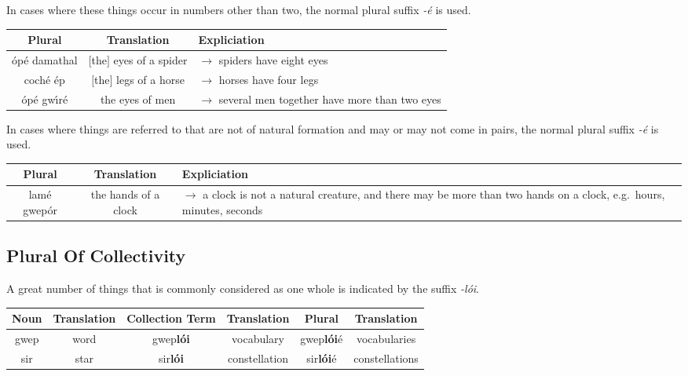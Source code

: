 In cases where these things occur in numbers other than two, the normal plural suffix \textit{-\'{e}} is used.
\begin{table}[H]
\centering
\begin{tabu}{c|c|M{10.0cm}}
  \textbf{Plural} & \textbf{Translation} & \textbf{Expliciation}\\
  \toprule
  \'{o}p\'{e} damathal & $[$the$]$ eyes of a spider & $\rightarrow$ spiders have eight eyes\\
  coch\'{e} \'{e}p & $[$the$]$ legs of a horse & $\rightarrow$ horses have four legs\\
  \'{o}p\'{e} gw\'{\i}r\'{e} & the eyes of men & $\rightarrow$ several men together have more than two eyes
\end{tabu}
\label{example_plural_more_than_two}
\end{table}

In cases where things are referred to that are not of natural formation and may or may not come in pairs, the normal plural suffix \textit{-\'{e}} is used.
\begin{table}[H]
\centering
\begin{tabu}{c|c|M{10.0cm}}
  \textbf{Plural} & \textbf{Translation} & \textbf{Expliciation}\\
  \toprule
  lam\'{e} gwep\'{o}r & the hands of a clock & $\rightarrow$ a clock is not a natural creature, and there may be more than two hands on a clock, e.g.\ hours, minutes, seconds\\
\end{tabu}
\label{example_plural_may_or_not}
\end{table}

\subsection{Plural Of Collectivity}

A great number of things that is commonly considered as one whole is indicated by the suffix \textit{-l\'{o}i}.
\begin{table}[H]
\centering
\begin{tabu}{c|c|c|c|c|c}
  \textbf{Noun} & \textbf{Translation} & \textbf{Collection Term} & \textbf{Translation} & \textbf{Plural} & \textbf{Translation}\\
  \toprule
  gwep & word & gwep\textbf{l\'{o}i} & vocabulary & gwep\textbf{l\'{o}i}\'{e} & vocabularies\\
  sir & star & sir\textbf{l\'{o}i} & constellation & sir\textbf{l\'{o}i}\'{e} & constellations
\end{tabu}
\label{example_plural_one_whole}
\end{table}

